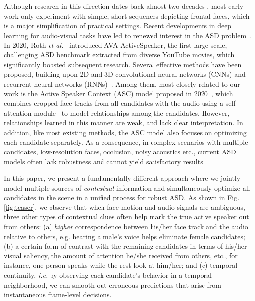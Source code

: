 \documentclass[sigconf]{acmart}
\begin{document}
\begin{CCSXML}
Although research in this direction dates back almost two decades \cite{DBLP:conf/icmcs/CutlerD00,DBLP:conf/nips/SlaneyC00}, most early work only experiment with simple, short sequences depicting frontal faces, which is a major simplification of practical settings. Recent developments in deep learning for audio-visual tasks have led to renewed interest in the ASD problem~\cite{DBLP:conf/accv/ChungZ16a,DBLP:conf/icassp/HooverCPSS18}. In 2020, Roth \textit{et al.}~\cite{DBLP:conf/icassp/RothCKMGKRSSXP20} introduced AVA-ActiveSpeaker, the first large-scale, challenging ASD benchmark extracted from diverse YouTube movies, which significantly boosted subsequent research. Several effective methods have been proposed, building upon 2D and 3D convolutional neural networks (CNNs) and recurrent neural networks (RNNs)~\cite{DBLP:conf/icassp/RothCKMGKRSSXP20,DBLP:journals/corr/abs-1906-10555,zhangmulti2019,DBLP:conf/cvpr/AlcazarCMPLAG20}. 
Among them, most closely related to our work is the Active Speaker Context (ASC) model proposed in 2020~\cite{DBLP:conf/cvpr/AlcazarCMPLAG20}, which combines cropped face tracks from all candidates with the audio using a self-attention module~\cite{DBLP:conf/nips/VaswaniSPUJGKP17} to model relationships among the candidates. However, relationships learned in this manner are weak, and lack clear interpretation. In addition, like most existing methods, the ASC model also focuses on optimizing each candidate separately. As a consequence, in complex scenarios with multiple candidates, low-resolution faces, occlusion, noisy acoustics etc., current ASD models often lack robustness and cannot yield satisfactory results. 

In this paper, we present a fundamentally different approach where we jointly model multiple sources of \textit{contextual} information and simultaneously optimize all candidates in the scene in a unified process for robust ASD. 
As shown in Fig. \ref{fig:teaser}, we observe that when face motion and audio signals are ambiguous, three other types of contextual clues often help mark the true active speaker out from others: 
(a) \textit{higher} correspondence between his/her face track and the audio relative to others, e.g. hearing a male's voice helps eliminate female candidates; 
(b) a certain form of contrast with the remaining candidates in terms of his/her visual saliency, the amount of attention he/she received from others, etc., for instance, one person speaks while the rest look at him/her; 
and (c) temporal continuity, \textit{i.e.} by observing each candidate's behavior in a temporal neighborhood, we can smooth out erroneous predictions that arise from instantaneous frame-level decisions.


\end{CCSXML}
\end{document}
